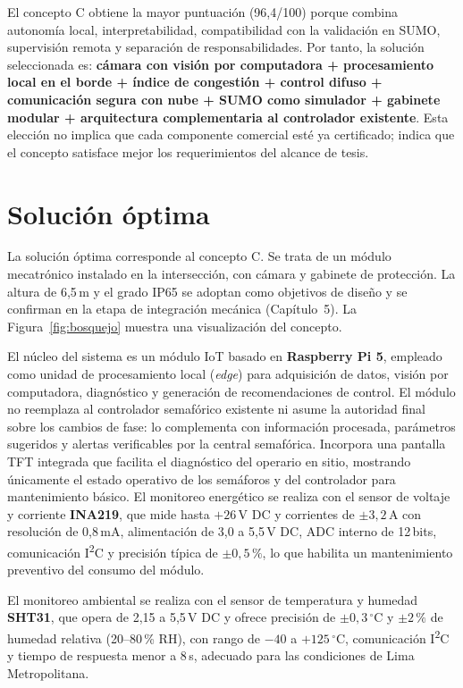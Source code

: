 El concepto C obtiene la mayor puntuación (96,4/100) porque combina autonomía local, interpretabilidad,
compatibilidad con la validación en SUMO, supervisión remota y separación de responsabilidades. Por tanto, la
solución seleccionada es: \textbf{cámara con visión por computadora + procesamiento local en el borde + índice
de congestión + control difuso + comunicación segura con nube + SUMO como simulador + gabinete modular +
arquitectura complementaria al controlador existente}. Esta elección no implica que cada componente comercial
esté ya certificado; indica que el concepto satisface mejor los requerimientos del alcance de tesis.

\section{Solución óptima}\label{sec:solucion-optima}

La solución óptima corresponde al concepto C. Se trata de un módulo mecatrónico instalado en la intersección,
con cámara y gabinete de protección. La altura de 6,5\,m y el grado IP65 se adoptan como objetivos de diseño y
se confirman en la etapa de integración mecánica (Capítulo~5). La Figura~\ref{fig:bosquejo} muestra una
visualización del concepto.

El núcleo del sistema es un módulo IoT basado en \textbf{Raspberry Pi 5}, empleado como unidad de
procesamiento local (\emph{edge}) para adquisición de datos, visión por computadora, diagnóstico y generación
de recomendaciones de control. El módulo no reemplaza al controlador semafórico existente ni asume la
autoridad final sobre los cambios de fase: lo complementa con información procesada, parámetros sugeridos y
alertas verificables por la central semafórica. Incorpora una pantalla TFT integrada que facilita el
diagnóstico del operario en sitio, mostrando únicamente el estado operativo de los semáforos y del controlador
para mantenimiento básico. El monitoreo energético se realiza con el sensor de voltaje y corriente
\textbf{INA219}, que mide hasta $+26$\,V DC y corrientes de $\pm 3{,}2$\,A con resolución de 0,8\,mA,
alimentación de 3,0 a 5,5\,V DC, ADC interno de 12\,bits, comunicación I\textsuperscript{2}C y precisión
típica de $\pm 0{,}5\,\%$, lo que habilita un mantenimiento preventivo del consumo del módulo.

El monitoreo ambiental se realiza con el sensor de temperatura y humedad \textbf{SHT31}, que opera de 2,15 a
5,5\,V DC y ofrece precisión de $\pm 0{,}3\,^{\circ}$C y $\pm 2\,\%$ de humedad relativa (20--80\,\% RH), con
rango de $-40$ a $+125\,^{\circ}$C, comunicación I\textsuperscript{2}C y tiempo de respuesta menor a 8\,s,
adecuado para las condiciones de Lima Metropolitana.

